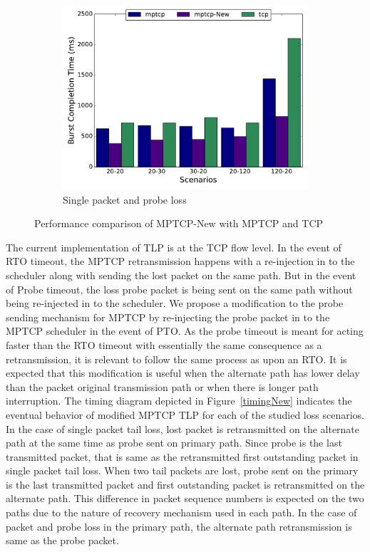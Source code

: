 \documentclass[10pt,conference]{IEEEtran}
\begin{document}
\begin{figure}
\begin{subfigure}[b]{0.32\textwidth}
\includegraphics[angle=0, width=\textwidth, natwidth=578.16,natheight=433.62]{plots/1PPNew.pdf}
\caption{Single packet and probe loss}\label{1ppn}
\end{subfigure}
\caption{Performance comparison of MPTCP-New with MPTCP and TCP}\label{mpnew}
\end{figure}

The current implementation of TLP is at the TCP flow level. In the event of RTO timeout, the MPTCP retransmission happens with a re-injection in 
to the scheduler along with sending the lost packet on the same path. But in the event of Probe timeout, the loss probe packet is being sent on 
the same path without being re-injected in to the scheduler. We propose a modification to the probe sending mechanism for MPTCP by re-injecting 
the probe packet in to the MPTCP scheduler in the event of PTO. As the probe timeout is meant for acting faster than the RTO timeout with 
essentially the same consequence as a retransmission, it is relevant to follow the same process as upon an RTO. It is expected that this 
modification is useful when the alternate path has lower delay than the packet original transmission path or when there is longer path 
interruption. The timing diagram depicted in Figure~\ref{timingNew} indicates the eventual behavior of modified MPTCP TLP for each of the studied 
loss scenarios. In the case of single packet tail loss, lost packet is retransmitted on the alternate path at the same time as probe sent on primary
path. Since probe is the last transmitted packet, that is same as the retransmitted first outstanding packet in single packet tail loss. When two tail packets are lost,
probe sent on the primary is the last transmitted packet and first outstanding packet is retransmitted on the alternate path. This difference in packet
sequence numbers is expected on the two paths due to the nature of recovery mechanism used in each path. In the case of packet and probe loss in the 
primary path, the alternate path retransmission is same as the probe packet.
\end{document}
